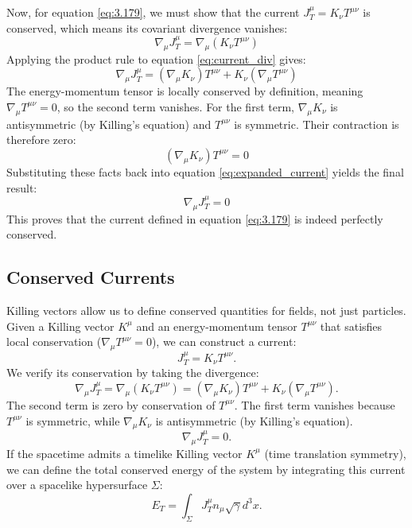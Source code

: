 \documentclass[11pt, a4paper]{report}
\begin{document}
Now, for equation \eqref{eq:3.179}, we must show that the current $J^\mu_T = K_\nu T^{\mu\nu}$ is conserved, which means its covariant divergence vanishes:
\begin{equation} \nabla_\mu J^\mu_T = \nabla_\mu (K_\nu T^{\mu\nu}) \label{eq:current_div} \end{equation}
Applying the product rule to equation \eqref{eq:current_div} gives:
\begin{equation} \nabla_\mu J^\mu_T = (\nabla_\mu K_\nu) T^{\mu\nu} + K_\nu (\nabla_\mu T^{\mu\nu}) \label{eq:expanded_current} \end{equation}
The energy-momentum tensor is locally conserved by definition, meaning $\nabla_\mu T^{\mu\nu} = 0$, so the second term vanishes. For the first term, $\nabla_\mu K_\nu$ is antisymmetric (by Killing's equation) and $T^{\mu\nu}$ is symmetric. Their contraction is therefore zero:
\begin{equation} (\nabla_\mu K_\nu) T^{\mu\nu} = 0 \label{eq:sym_antisym} \end{equation}
Substituting these facts back into equation \eqref{eq:expanded_current} yields the final result:
\begin{equation} \nabla_\mu J^\mu_T = 0 \label{eq:3.179} \end{equation}
This proves that the current defined in equation \eqref{eq:3.179} is indeed perfectly conserved.
\subsection*{Conserved Currents}
Killing vectors allow us to define conserved quantities for fields, not just particles. Given a Killing vector \(K^\mu\) and an energy-momentum tensor \(T^{\mu\nu}\) that satisfies local conservation (\(\nabla_\mu T^{\mu\nu} = 0\)), we can construct a current:
\begin{equation}
J^\mu_T = K_\nu T^{\mu\nu}.
\end{equation}
We verify its conservation by taking the divergence:
\begin{equation}
\nabla_\mu J^\mu_T = \nabla_\mu (K_\nu T^{\mu\nu}) = (\nabla_\mu K_\nu) T^{\mu\nu} + K_\nu (\nabla_\mu T^{\mu\nu}).
\end{equation}
The second term is zero by conservation of \(T^{\mu\nu}\).
The first term vanishes because \(T^{\mu\nu}\) is symmetric, while \(\nabla_\mu K_\nu\) is antisymmetric (by Killing's equation).
\begin{equation}
\nabla_\mu J^\mu_T = 0.
\end{equation}
If the spacetime admits a timelike Killing vector \(K^\mu\) (time translation symmetry), we can define the total conserved energy of the system by integrating this current over a spacelike hypersurface \(\Sigma\):
\begin{equation}
E_T = \int_\Sigma J^\mu_T n_\mu \sqrt{\gamma} d^3x.
\end{equation}
\end{document}
